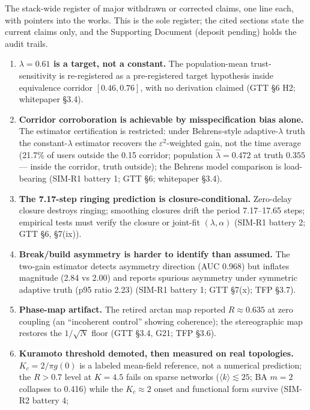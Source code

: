 \documentclass[
]{article}
\begin{document}
The stack-wide register of major withdrawn or corrected claims, one line
each, with pointers into the works. This is the sole register; the cited
sections state the current claims only, and the Supporting Document
(deposit pending) holds the audit trails.

\begin{enumerate}
\def\labelenumi{\arabic{enumi}.}
\item
  \textbf{\(\lambda = 0.61\) is a target, not a constant.} The
  population-mean trust-sensitivity is re-registered as a pre-registered
  target hypothesis inside equivalence corridor \([0.46, 0.76]\), with
  no derivation claimed (GTT §6 H2; whitepaper §3.4).
\item
  \textbf{Corridor corroboration is achievable by misspecification bias
  alone.} The estimator certification is restricted: under Behrens-style
  adaptive-\(\lambda\) truth the constant-\(\lambda\) estimator recovers
  the \(\varepsilon^2\)-weighted gain, not the time average (21.7\% of
  users outside the 0.15 corridor; population \(\hat{\lambda} = 0.472\)
  at truth \(0.355\) --- inside the corridor, truth outside); the
  Behrens model comparison is load-bearing (SIM-R1 battery 1; GTT §6;
  whitepaper §3.4).
\item
  \textbf{The 7.17-step ringing prediction is closure-conditional.}
  Zero-delay closure destroys ringing; smoothing closures drift the
  period 7.17--17.65 steps; empirical tests must verify the closure or
  joint-fit \((\lambda, \alpha)\) (SIM-R1 battery 2; GTT §6, §7(ix)).
\item
  \textbf{Break/build asymmetry is harder to identify than assumed.} The
  two-gain estimator detects asymmetry direction (AUC 0.968) but
  inflates magnitude (2.84 vs 2.00) and reports spurious asymmetry under
  symmetric adaptive truth (p95 ratio 2.23) (SIM-R1 battery 1; GTT
  §7(x); TFP §3.7).
\item
  \textbf{Phase-map artifact.} The retired arctan map reported
  \(R \approx 0.635\) at zero coupling (an ``incoherent control''
  showing coherence); the stereographic map restores the \(1/\sqrt{N}\)
  floor (GTT §3.4, G21; TFP §3.6).
\item
  \textbf{Kuramoto threshold demoted, then measured on real topologies.}
  \(K_c = 2/\pi g(0)\) is a labeled mean-field reference, not a
  numerical prediction; the \(R > 0.7\) level at \(K = 4.5\) fails on
  sparse networks (\(\langle k\rangle
  \lesssim 25\); BA \(m = 2\) collapses to 0.416) while the
  \(K_c \approx 2\) onset and functional form survive (SIM-R2 battery 4;

\end{enumerate}
\end{document}
